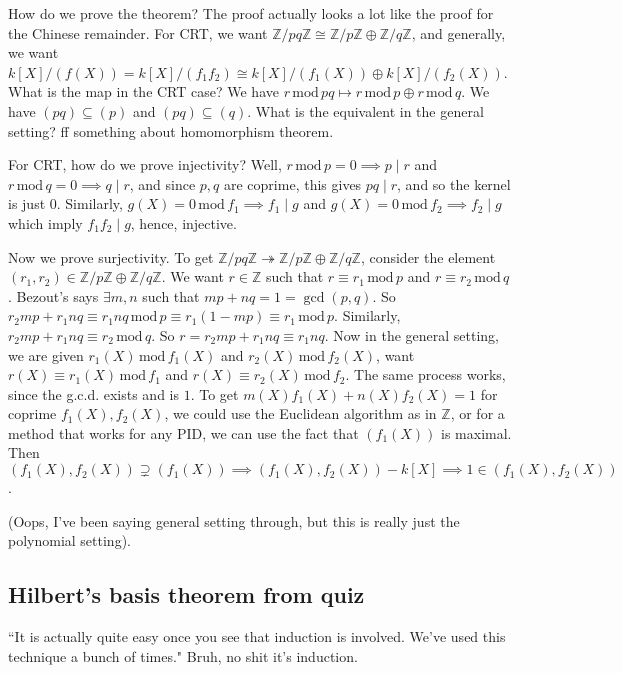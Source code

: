 \documentclass{article}
\theoremstyle{plain}
\theoremstyle{remark}
\newcommand{\Z}{{\mathbb Z}}
\begin{document}
How do we prove the theorem?
The proof actually looks a lot like the proof for the Chinese remainder.
For CRT, we want $\Z/pq\Z \cong \Z/p\Z \oplus \Z/q\Z$,
and generally, we want $k[X]/(f(X)) = k[X]/(f_1f_2) \cong k[X]/(f_1(X)) \oplus k[X]/(f_2(X))$.
What is the map in the CRT case?
We have $r \, \mathrm{mod}\, pq \mapsto r \, \mathrm{mod} \, p \oplus
r \, \mathrm{mod} \, q$.
We have $(pq) \subseteq (p)$ and $(pq) \subseteq (q)$.
What is the equivalent in the general setting?
ff something about homomorphism theorem.

For CRT, how do we prove injectivity?
Well, $r \, \mathrm{mod}\, p = 0 \implies p \mid r$
and $r \, \mathrm{mod}\, q = 0 \implies q \mid r$,
and since $p,q$ are coprime, this gives $pq \mid r$,
and so the kernel is just $0$.
Similarly, $g(X) = 0 \, \mathrm{mod} \, f_1 \implies f_1 \mid g$
and $g(X) = 0 \, \mathrm{mod} \, f_2 \implies f_2 \mid g$
which imply $f_1f_2 \mid g$, hence, injective.

Now we prove surjectivity.
To get $\Z/pq\Z \twoheadrightarrow \Z/p\Z \oplus \Z/q\Z$,
consider the element $(r_1,r_2) \in \Z/p\Z \oplus \Z/q\Z$.
We want $r \in \Z$ such that $r \equiv r_1 \, \mathrm{mod}\, p$
and $r \equiv r_2 \, \mathrm{mod} \, q$.
Bezout's says $\exists m,n$ such that
$mp + nq = 1 = \gcd(p,q)$.
So $r_2mp + r_1nq \equiv r_1nq \, \mathrm{mod}\, p \equiv
r_1 (1 - mp) \equiv r_1 \, \mathrm{mod}\, p$.
Similarly, $r_2mp + r_1nq \equiv r_2 \, \mathrm{mod}\, q$.
So $r = r_2mp + r_1nq \equiv r_1nq$.
Now in the general setting, we are given
$r_1(X) \, \mathrm{mod} \, f_1(X)$ and $r_2(X) \, \mathrm{mod}\, f_2(X)$,
want $r(X) \equiv r_1(X) \, \mathrm{mod}\, f_1$ and $r(X) \equiv r_2(X)\,\mathrm{mod}\,f_2$. 
The same process works, since the g.c.d. exists and is $1$.
To get $m(X)f_1(X) + n(X)f_2(X) = 1$ for coprime $f_1(X),f_2(X)$,
we could use the Euclidean algorithm as in $\Z$,
or for a method that works for any PID,
we can use the fact that $(f_1(X))$ is maximal.
Then $(f_1(X),f_2(X)) \supsetneq (f_1(X)) \implies
(f_1(X),f_2(X)) - k[X] \implies 1 \in (f_1(X),f_2(X))$.

(Oops, I've been saying general setting through, but this is really
just the polynomial setting).

\subsection{Hilbert's basis theorem from quiz}
``It is actually quite easy once you see that induction is involved.
We've used this technique a bunch of times."
Bruh, no shit it's induction.
\end{document}
